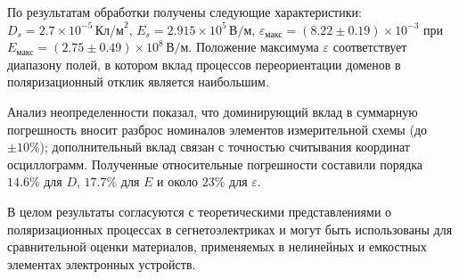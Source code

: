 \documentclass[a4paper,14pt]{article}
\begin{document}
    По результатам обработки получены следующие характеристики: \(D_s = 2.7 \times 10^{-5}\,\text{Кл/м}^2\), \(E_s = 2.915 \times 10^5\,\text{В/м}\), \(\varepsilon_{\text{макс}} = (8.22 \pm 0.19) \times 10^{-3}\) при \(E_{\text{макс}} = (2.75 \pm 0.49)\times 10^8\,\text{В/м}\). Положение максимума \(\varepsilon\) соответствует диапазону полей, в котором вклад процессов переориентации доменов в поляризационный отклик является наибольшим.

    Анализ неопределенности показал, что доминирующий вклад в суммарную погрешность вносит разброс номиналов элементов измерительной схемы (до \(\pm 10\%\)); дополнительный вклад связан с точностью считывания координат осциллограмм. Полученные относительные погрешности составили порядка \(14.6\%\) для \(D\), \(17.7\%\) для \(E\) и около \(23\%\) для \(\varepsilon\).

    В целом результаты согласуются с теоретическими представлениями о поляризационных процессах в сегнетоэлектриках и могут быть использованы для сравнительной оценки материалов, применяемых в нелинейных и емкостных элементах электронных устройств.
\end{document}
